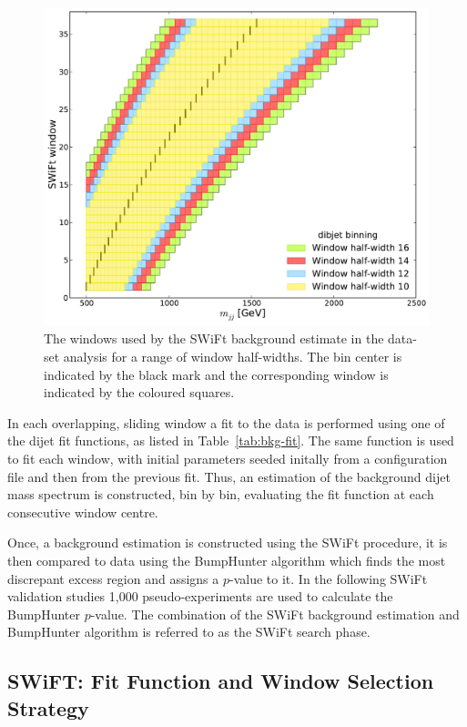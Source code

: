 \begin{figure}[!htb]
\centering
\includegraphics[width=0.6\linewidth, angle=0]{figs/Dibjet/LowMass/evt-swiftBins_min500_fl0_fh0_tr0.pdf}
\caption{\label{fig:bkg-lm_swiftBins}
  The windows used by the SWiFt background estimate in the \lm{} data-set analysis for a range of window half-widths.
  The bin center is indicated by the black mark and the corresponding window is indicated by the coloured squares.}
\end{figure}

In each overlapping, sliding window a fit to the data is performed using one of the dijet fit functions, as listed in Table~\ref{tab:bkg-fit}.
The same function is used to fit each window,
with initial parameters seeded initally from a configuration file and then from the previous fit.
Thus, an estimation of the background dijet mass spectrum is constructed, bin by bin,
evaluating the fit function at each consecutive window centre.

Once, a background estimation is constructed using the SWiFt procedure,
it is then compared to data using the {\sc BumpHunter} algorithm which finds the most discrepant excess region and assigns a \mbox{$p$-value} to it.
In the following SWiFt validation studies 1,000 pseudo-experiments are used to calculate the {\sc BumpHunter} \mbox{$p$-value}.
The combination of the SWiFt background estimation and {\sc BumpHunter} algorithm is referred to as the SWiFt search phase.

\subsection{SWiFT: Fit Function and Window Selection Strategy}
\label{sec:windowSel}

